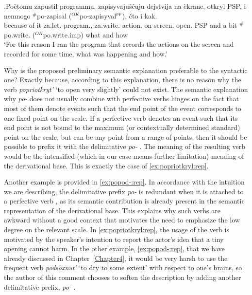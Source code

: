 \exg.\label{ex:po:Tat2:rep}Po\`{e}tomu zapustil programmu, zapisyvaju\v{s}\v{c}uju dejstvija na \`{e}krane, otkryl PSP, i nemnogo $^\#$po-zapisal ($^{\textit{OK}}$po-zapisyval$^{\textsc{pf}}$), \v{c}to i kak.\\
{because of it} za.let. program., za.write. action. on screen. open. PSP and {a bit} $^\#$po.write. ($^{\textit{OK}}$po.write.imp) what and how\\
\trans `For this reason I ran the program that records the actions on the screen and recorded for some time, what was happening and how.'\\ 

Why is the proposed preliminary semantic explanation preferable to the syntactic one? Exactly because, according to this explanation, there is no reason why the verb \textit{popriotkryt'} `to open very slightly' could not exist. The semantic explanation why \textit{po-}   does not usually combine with perfective verbs  hinges on the fact that most of them denote events such that the end point of the event corresponds to one fixed point on the scale. If a perfective verb  denotes an event such that its end point is not bound to the maximum (or contextually determined standard) point on the scale, but can be any point from a range of points, then it should be possible to prefix it with the delimitative  \textit{po-}  . The meaning of the resulting verb would be the intensified (which in our case means further limitation) meaning of the derivational base. This is exactly the case of \ref{ex:popriotkryl:rep}.

Another example is provided in \ref{ex:popod-:rep}. In accordance with the intuition we are describing, the delimitative  prefix \textit{po-}   is redundant when it is attached to a perfective verb , as its semantic contribution is already present in the semantic representation of the derivational base. This explains why such verbs are awkward without a good context   that motivates the need to emphasize the low degree on the relevant scale. In \ref{ex:popriotkryl:rep}, the usage of the verb is motivated by the speaker's intention to report the actor's idea that a tiny opening cannot harm. In the other example, \ref{ex:popod-:rep}, that we have already discussed in Chapter~\ref{Chapter4}, it would be very harsh to use the frequent verb \textit{podsoxnut'} `to dry to some extent' with respect to one's brains, so the author of this comment chooses to soften the description by adding another delimitative  prefix, \textit{po-}  . 

